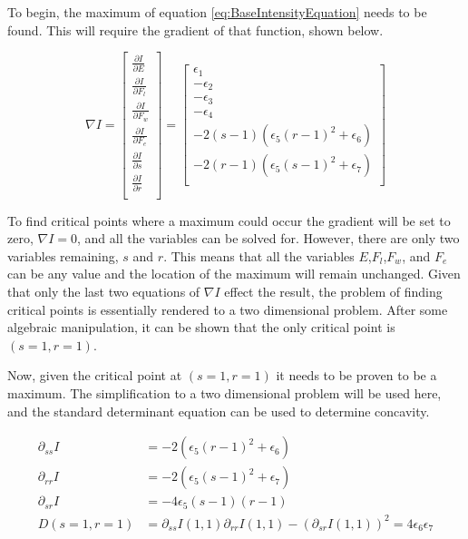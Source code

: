 To begin, the maximum of equation \ref{eq:BaseIntensityEquation} needs to be found. This will require the gradient of that function, shown below.

\begin{equation*}
	\nabla I =
	\left[
	\begin{matrix}
		\frac{\partial I}{\partial E} \\
		\frac{\partial I}{\partial F_l} \\
		\frac{\partial I}{\partial F_w} \\
		\frac{\partial I}{\partial F_e} \\ 
		\frac{\partial I}{\partial s} \\
		\frac{\partial I}{\partial r} \\
	\end{matrix}
	\right] =
	\left[
	\begin{matrix}
		\epsilon_1 \\
		-\epsilon_2 \\
		-\epsilon_3 \\
		-\epsilon_4 \\
		-2(s-1)\left( \epsilon_5(r-1)^2+\epsilon_6 \right) \\
		-2(r-1)\left( \epsilon_5(s-1)^2+\epsilon_7 \right) \\
	\end{matrix}
	\right]
\end{equation*}

To find critical points where a maximum could occur the gradient will be set to zero, $\nabla I=0$, and all the variables can be solved for. However, there are only two variables remaining, $s$ and $r$. This means that all the variables $E$,$F_l$,$F_w$, and $F_e$ can be any value and the location of the maximum will remain unchanged. Given that only the last two equations of $\nabla I$ effect the result, the problem of finding critical points is essentially rendered to a two dimensional problem. After some algebraic manipulation, it can be shown that the only critical point is $(s=1,r=1)$.

Now, given the critical point at $(s=1,r=1)$ it needs to be proven to be a maximum. The simplification to a two dimensional problem will be used here, and the standard determinant equation can be used to determine concavity.

\begin{equation*}
	\begin{split}
		\partial_{ss}I & = -2\left( 
			\epsilon_5(r-1)^2+\epsilon_6 
		\right) \\
		\partial_{rr}I & = -2\left( 
			\epsilon_5(s-1)^2+\epsilon_7 
		\right) \\
		\partial_{sr}I & = -4 \epsilon_5 (s-1)(r-1) \\
		D(s=1,r=1) & = \partial_{ss}I(1,1) \partial_{rr}I(1,1)-\left(
			\partial_{sr} I(1,1)
		\right)^2 = 4\epsilon_6 \epsilon_7
	\end{split}
\end{equation*}

